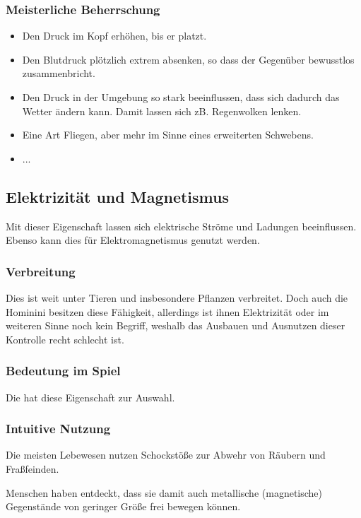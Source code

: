 \subsubsection{Meisterliche Beherrschung} 
\begin{itemize}
	\item Den Druck im Kopf erhöhen, bis er platzt.
	\item Den Blutdruck plötzlich extrem absenken, so dass der Gegenüber bewusstlos zusammenbricht. 
	\item Den Druck in der Umgebung so stark beeinflussen, dass sich dadurch das Wetter ändern kann. Damit lassen sich zB. Regenwolken lenken. 
	\item Eine Art Fliegen, aber mehr im Sinne eines erweiterten Schwebens.
	\item ...
\end{itemize}



\subsection{Elektrizität und Magnetismus}\label{sec:elektromagie}
Mit dieser Eigenschaft lassen sich elektrische Ströme und Ladungen beeinflussen. Ebenso kann dies für Elektromagnetismus genutzt werden.

\subsubsection{Verbreitung}
Dies ist weit unter Tieren und insbesondere Pflanzen verbreitet. Doch auch die Hominini besitzen diese Fähigkeit, allerdings ist ihnen Elektrizität oder im weiteren Sinne noch kein Begriff, weshalb das Ausbauen und Ausnutzen dieser Kontrolle recht schlecht ist.

\subsubsection{Bedeutung im Spiel}
Die  hat diese Eigenschaft zur Auswahl. 

\subsubsection{Intuitive Nutzung}
Die meisten Lebewesen nutzen Schockstöße zur Abwehr von Räubern und Fraßfeinden.  

Menschen haben entdeckt, dass sie damit auch metallische (magnetische) Gegenstände von geringer Größe frei bewegen können.

